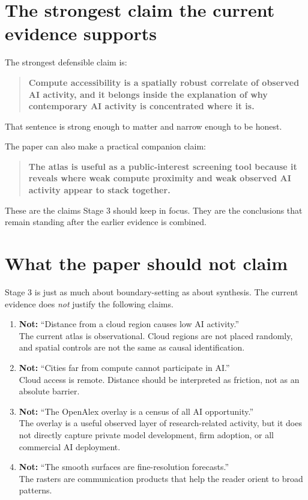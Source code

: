\documentclass[11pt]{article}
\begin{document}
\section{The strongest claim the current evidence supports}
The strongest defensible claim is:
\begin{quote}
\textbf{Compute accessibility is a spatially robust correlate of observed AI activity, and it belongs inside the explanation of why contemporary AI activity is concentrated where it is.}
\end{quote}

That sentence is strong enough to matter and narrow enough to be honest.

The paper can also make a practical companion claim:
\begin{quote}
\textbf{The atlas is useful as a public-interest screening tool because it reveals where weak compute proximity and weak observed AI activity appear to stack together.}
\end{quote}

These are the claims Stage 3 should keep in focus. They are the conclusions that remain standing after the earlier evidence is combined.

\section{What the paper should not claim}
Stage 3 is just as much about boundary-setting as about synthesis. The current evidence does \emph{not} justify the following claims.
\begin{enumerate}[leftmargin=*]
    \item \textbf{Not:} ``Distance from a cloud region causes low AI activity.''\\
    The current atlas is observational. Cloud regions are not placed randomly, and spatial controls are not the same as causal identification.
    \item \textbf{Not:} ``Cities far from compute cannot participate in AI.''\\
    Cloud access is remote. Distance should be interpreted as friction, not as an absolute barrier.
    \item \textbf{Not:} ``The OpenAlex overlay is a census of all AI opportunity.''\\
    The overlay is a useful observed layer of research-related activity, but it does not directly capture private model development, firm adoption, or all commercial AI deployment.
    \item \textbf{Not:} ``The smooth surfaces are fine-resolution forecasts.''\\
    The rasters are communication products that help the reader orient to broad patterns.
\end{enumerate}
\end{document}
